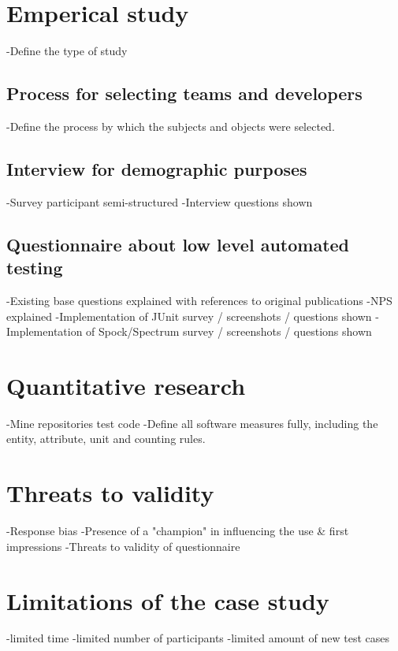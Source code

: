\section{Emperical study}
-Define the type of study
\subsection{Process for selecting teams and developers}
-Define the process by which the subjects and objects were selected.\newline
\subsection{Interview for demographic purposes}
-Survey participant semi-structured\newline
-Interview questions shown\newline
\subsection{Questionnaire about low level automated testing}
    -Existing base questions explained with references to original publications\newline
    -NPS explained\newline
    -Implementation of JUnit survey / screenshots / questions shown\newline
    -Implementation of Spock/Spectrum survey / screenshots / questions shown\newline\newline



\section{Quantitative research}
-Mine repositories test code\newline
    -Define all software measures fully, including the entity, attribute, unit and counting rules.

\section{Threats to validity}
-Response bias\newline
-Presence of a "champion" in influencing the use & first impressions\newline
-Threats to validity of questionnaire\newline\newline
\section{Limitations of the case study}
-limited time\newline
-limited number of participants\newline
-limited amount of new test cases\newline


